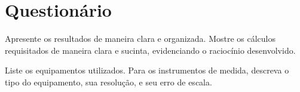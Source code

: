 \cleardoublepage


\vspace{15mm}

\begin{fullwidth}
\noindent{}
\vspace{5mm}

\noindent{}

\noindent{}

\noindent{}

\noindent{}

\noindent{}
\end{fullwidth}

\vspace{5mm}

\section{Questionário}

\begin{question}[type={exam}]{1}
Apresente os resultados de maneira clara e organizada. Mostre os cálculos requisitados de maneira clara e sucinta, evidenciando o raciocínio desenvolvido.
\end{question}

\begin{question}[type={exam}]{1}
Liste os equipamentos utilizados. Para os instrumentos de medida, descreva o tipo do equipamento, sua resolução, e seu erro de escala.
\end{question}

